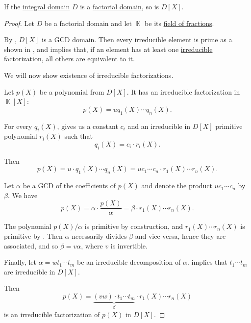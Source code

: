 \begin{proposition}\label{thm:polynomial_ring_over_factorial}
  If the \hyperref[def:integral_domain]{integral domain} \( D \) is a \hyperref[def:factorial_domain]{factorial domain}, so is \( D[X] \).
\end{proposition}
\begin{proof}
  Let \( D \) be a factorial domain and let \( \BbbK \) be its \hyperref[thm:field_of_fractions]{field of fractions}.

  By , \( D[X] \) is a GCD domain. Then every irreducible element is prime as a shown in , and  implies that, if an element has at least one \hyperref[def:irreducible_factorization]{irreducible factorization}, all others are equivalent to it.

  We will now show existence of irreducible factorizations.

  Let \( p(X) \) be a polynomial from \( D[X] \). It has an irreducible factorization in \( \BbbK[X] \):
  \begin{equation*}
    p(X) = u q_1(X) \cdots q_n(X).
  \end{equation*}

  For every \( q_i(X) \),  gives us a constant \( c_i \) and an irreducible in \( D[X] \) primitive polynomial \( r_i(X) \) such that
  \begin{equation*}
    q_i(X) = c_i \cdot r_i(X).
  \end{equation*}

  Then
  \begin{equation*}
    p(X)
    =
    u \cdot q_1(X) \cdots q_n(X)
    =
    u c_1 \cdots c_n \cdot r_1(X) \cdots r_n(X).
  \end{equation*}

  Let \( \alpha \) be a GCD of the coefficients of \( p(X) \) and denote the product \( u c_1 \cdots c_n \) by \( \beta \). We have
  \begin{equation*}
    p(X) = \alpha \cdot \frac {p(X)} \alpha = \beta \cdot r_1(X) \cdots r_n(X).
  \end{equation*}

  The polynomial \( p(X) / \alpha \) is primitive by construction, and \( r_1(X) \cdots r_n(X) \) is primitive by . Then \( \alpha \) necessarily divides \( \beta \) and vice versa, hence they are associated, and so \( \beta = v \alpha \), where \( v \) is invertible.

  Finally, let \( \alpha = w t_1 \cdots t_m \) be an irreducible decomposition of \( \alpha \).  implies that \( t_1 \cdots t_m \) are irreducible in \( D[X] \).

  Then
  \begin{equation*}
    p(X) = \underbrace{(v w) \cdot t_1 \cdots t_m}_{\beta} \cdot r_1(X) \cdots r_n(X)
  \end{equation*}
  is an irreducible factorization of \( p(X) \) in \( D[X] \).
\end{proof}
